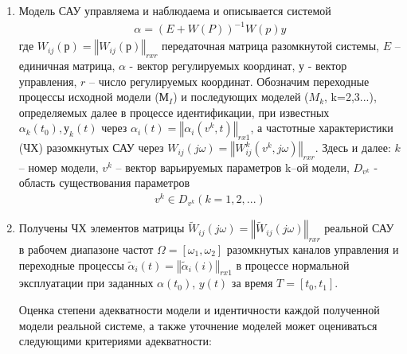 \begin{enumerate}
	\item Модель САУ управляема и наблюдаема \cite[]{Bessekerski20} и описывается системой 
	\begin{equation}
	\label{eq:p2:8-}
	\begin{alignedat}{2}
	\alpha{}={\left(E+W(P)\right)}^{-1}W(p)y
	\end{alignedat}
	\end{equation}
	где $W_{ij}(р)={\left\Vert{}W_{ij}(р)\right\Vert{}}_{rxr}$	
	передаточная матрица разомкнутой системы, 
	$E$ – единичная матрица,
	$\alpha$ - вектор регулируемых координат, 
	$у$ - вектор управления, 
	$r$ – число регулируемых координат. 
	Обозначим переходные процессы исходной модели ($М_I$) и последующих моделей ($M_k$, k=2,3...), 
	определяемых далее в процессе идентификации, при известных $\alpha_k (t_0 ), у_k (t)$ через 
	$\alpha_{i} (t)={\left\Vert{} \alpha_{i}(v^k,t) \right\Vert{}}_{rx1}$, 
	а частотные характеристики (ЧХ) разомкнутых САУ через 
	$W_{ij}(j\omega) = {\left\Vert{} W^k_{ij}(v^k, j\omega) \right\Vert{}}_{rxr}$. 
	Здесь и далее: $k$ – номер модели, $v^k$ – вектор варьируемых параметров k–ой модели, $D_{v^k}$ - область существования параметров
	\begin{equation}
	\label{eq:p2:9-}
	\begin{alignedat}{2}
	v^k \in D_{v^k} (k= 1,2,...)
	\end{alignedat}
	\end{equation}	
	\item Получены ЧХ элементов матрицы 
	$\tilde{W}_{ij}(j\omega) = {\left\Vert{} \tilde{W}_{ij}( j\omega) \right\Vert{}}_{rxr}$
	реальной САУ в рабочем диапазоне частот 
	$\Omega{}=\left[{\omega{}}_1,{\omega{}}_2\right]$ 
	разомкнутых каналов управления и переходные процессы 
	$\tilde{\alpha}_{i}(t) = {\left\Vert{} \tilde{\alpha}_{i}(i) \right\Vert{}}_{rx1}$
	в процессе нормальной эксплуатации при заданных 
	$\alpha(t_0)$, $y(t)$ за время $T=[t_0,t_1]$.
	
	Оценка степени адекватности модели и идентичности каждой полученной модели реальной системе, а также уточнение моделей может оцениваться следующими критериями адекватности: 
	

\end{enumerate}
